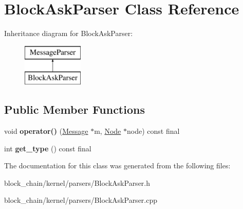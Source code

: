\hypertarget{classBlockAskParser}{}\section{Block\+Ask\+Parser Class Reference}
\label{classBlockAskParser}
Inheritance diagram for Block\+Ask\+Parser\+:\begin{figure}[H]
\begin{center}
\leavevmode
\includegraphics[height=2.000000cm]{classBlockAskParser}
\end{center}
\end{figure}
\subsection*{Public Member Functions}
\begin{DoxyCompactItemize}
\item 
\mbox{\label{classBlockAskParser_a32d280786db26389f58175681ba35261}} 
void {\bfseries operator()} (\mbox{\hyperlink{classMessage}{Message}} $\ast$m, \mbox{\hyperlink{classNode}{Node}} $\ast$node) const final
\item 
\mbox{\label{classBlockAskParser_add75da897c34702c33790947c9754500}} 
int {\bfseries get\+\_\+type} () const final
\end{DoxyCompactItemize}


The documentation for this class was generated from the following files\+:\begin{DoxyCompactItemize}
\item 
block\+\_\+chain/kernel/parsers/Block\+Ask\+Parser.\+h\item 
block\+\_\+chain/kernel/parsers/Block\+Ask\+Parser.\+cpp\end{DoxyCompactItemize}

